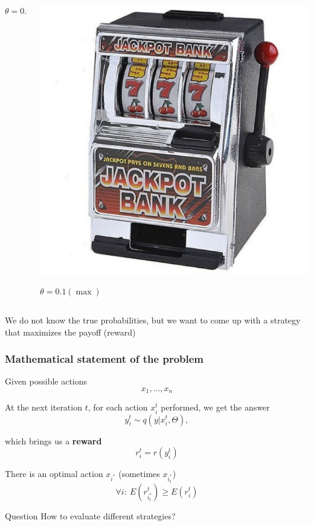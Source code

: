 \documentclass[fullscreen=true, bookmarks=true, hyperref={pdfencoding=unicode}]{beamer}
\begin{document}
\begin{frame}
\begin{columns}
\begin{column}{.25\paperwidth}
\begin{center}
        $\theta = 0.05$
        \end{center}
      \end{column}
      \begin{column}{.25\paperwidth}
        \begin{center}
          \includegraphics[keepaspectratio,
                           width=.2\paperwidth]{data-kopilkabandit.jpg}

           $\theta = 0.1 (\max)$
        \end{center}
      \end{column}
  \end{columns}

  \vspace{1cm}
  We do not know the true probabilities, but we want to come up with a strategy that maximizes the payoff (reward)
\end{frame}


\begin{frame}
  \frametitle{Mathematical statement of the problem}

  Given possible actions $$x_1, \dots, x_n$$

  \pause
  At the next iteration $t$, for each action $x^t_i$ performed, we get the answer $$ y^t_i \sim q(y|x^t_i, \Theta),$$

  \pause
  which brings us a {\bf reward} $$r_i^t = r(y^t_i)$$

  \pause
  There is an optimal action $x_{i^*}$ (sometimes $x_{i^*_t}$) $$\forall i:\ E(r_{i^*_t}^t) \geq E(r^t_i) $$

  \pause
  \begin{block}{Question}
    How to evaluate different strategies?
  \end{block}
\end{frame}
\end{document}
